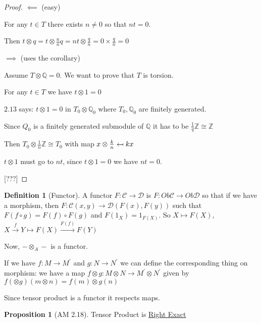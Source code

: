 \documentclass{article}
\theoremstyle{definition}
\newtheorem{definition}{Definition}
\newtheorem{proposition}{Proposition}
\begin{document}
\begin{proof}
    \(\impliedby \) (easy)

    For any \(t\in T\) there exists \(n \neq 0\) so that \(nt = 0\).

    Then \(t \otimes q = t \otimes \frac{n}{n}q = nt \otimes \frac{q}{n} = 0\times \frac{q}{n} = 0\) 

    \(\implies \) (uses the corollary)

    Assume \(T \otimes \mathbb{Q} = 0\). We want to prove that \(T\) is torsion.

    For any \(t\in T\) we have \(t \otimes 1 = 0\) 

    \(2.13\) says: \(t \otimes 1 = 0\) in \(T_0 \otimes \mathbb{Q}_0\) where \(T_0,\mathbb{Q}_0\) are finitely generated.

    Since \(Q_0\) is a finitely generated submodule of \(\mathbb{Q}\) it has to be \(\frac{1}{q}\mathbb{Z}\cong \mathbb{Z}\)

    Then \(T_0 \otimes \frac{1}{n}\mathbb{Z} \cong T_0\) with map \(x \otimes \frac{k}{n} \mathrel{\reflectbox{\ensuremath{\mapsto}}} kx\)
    
    \(t \otimes 1\) must go to \(nt\), since \(t \otimes 1 = 0\) we have \(nt = 0\).

    [???]

\end{proof}

\begin{definition}
    [Functor] A functor \(F: \mathcal{C} \to \mathcal{D}\) is \(F: Ob \mathcal{C} \to Ob \mathcal{D}\) so that if we have a morphism, then \(F: \mathcal{C} (x,y) \to \mathcal{D} (F(x),F(y))\) such that \(F(f\circ g) = F(f)\circ F(g)\) and \(F(1_X)=1_{F(X)}\). So \(X \mapsto F(X)\), \(X \overset{f}{\to } Y \mapsto F(X) \overset{F(f)}{\to } F(Y)\) 
\end{definition}

Now, \(- \otimes_A -\) is a functor.

If we have \(f: M \to M^{\prime} \) and \(g: N \to N^{\prime} \) we can define the corresponding thing on morphism: we have a map \(f \otimes g: M \otimes N \to M^{\prime} \otimes N^{\prime} \) given by \(f(\otimes g)(m \otimes n) = f(m) \otimes g(n)\) 

Since tensor product is a functor it respects maps.

\begin{proposition}[AM 2.18]
    Tensor Product is \underline{Right Exact}
\end{proposition}
\end{document}
